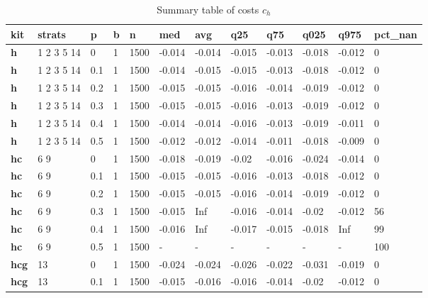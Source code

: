 \begin{longtable}[h]{|p{0.8cm}|p{1.5cm}|p{1cm}|p{1cm}|p{1cm}|p{1cm}|p{1cm}|p{1cm}|p{1cm}|p{1cm}|p{1cm}|p{1.5cm}|}
\caption{Summary table of costs $c_h$}
\label{tab:costs_mod_h} \\
      \hline
\textbf{ kit} & \textbf{ strats} & \textbf{ p} & \textbf{ b} & \textbf{ n} & \textbf{ med} & \textbf{ avg} & \textbf{ q25} & \textbf{ q75} & \textbf{ q025} & \textbf{ q975} & \textbf{ pct\_nan}
    \\ \hline
  \textbf{h   } &  1 2 3 5 14 &   0 & 1 & 1500 & -0.014 & -0.014 & -0.015 & -0.013 & -0.018 & -0.012 &   0
    \\ \hline
  \textbf{h   } &  1 2 3 5 14 & 0.1 & 1 & 1500 & -0.014 & -0.015 & -0.015 & -0.013 & -0.018 & -0.012 &   0
    \\ \hline
  \textbf{h   } &  1 2 3 5 14 & 0.2 & 1 & 1500 & -0.015 & -0.015 & -0.016 & -0.014 & -0.019 & -0.012 &   0
    \\ \hline
  \textbf{h   } &  1 2 3 5 14 & 0.3 & 1 & 1500 & -0.015 & -0.015 & -0.016 & -0.013 & -0.019 & -0.012 &   0
    \\ \hline
  \textbf{h   } &  1 2 3 5 14 & 0.4 & 1 & 1500 & -0.014 & -0.014 & -0.016 & -0.013 & -0.019 & -0.011 &   0
    \\ \hline
  \textbf{h   } &  1 2 3 5 14 & 0.5 & 1 & 1500 & -0.012 & -0.012 & -0.014 & -0.011 & -0.018 & -0.009 &   0
    \\ \hline
  \textbf{hc  } &  6 9        &   0 & 1 & 1500 & -0.018 & -0.019 &  -0.02 & -0.016 & -0.024 & -0.014 &   0
    \\ \hline
  \textbf{hc  } &  6 9        & 0.1 & 1 & 1500 & -0.015 & -0.015 & -0.016 & -0.013 & -0.018 & -0.012 &   0
    \\ \hline
  \textbf{hc  } &  6 9        & 0.2 & 1 & 1500 & -0.015 & -0.015 & -0.016 & -0.014 & -0.019 & -0.012 &   0
    \\ \hline
  \textbf{hc  } &  6 9        & 0.3 & 1 & 1500 & -0.015 &    Inf & -0.016 & -0.014 &  -0.02 & -0.012 &  56
    \\ \hline
  \textbf{hc  } &  6 9        & 0.4 & 1 & 1500 & -0.016 &    Inf & -0.017 & -0.015 & -0.018 &    Inf &  99
    \\ \hline
  \textbf{hc  } &  6 9        & 0.5 & 1 & 1500 & - & - & - & - & - & - & 100
    \\ \hline
  \textbf{hcg } &  13         &   0 & 1 & 1500 & -0.024 & -0.024 & -0.026 & -0.022 & -0.031 & -0.019 &   0
    \\ \hline
  \textbf{hcg } &  13         & 0.1 & 1 & 1500 & -0.015 & -0.016 & -0.016 & -0.014 &  -0.02 & -0.012 &   0

\end{longtable}
